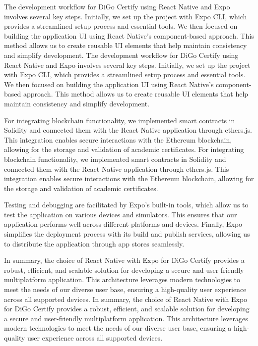 The development workflow for DiGo Certify using React Native and Expo involves several key steps. Initially, we set up the project with Expo CLI, which provides a streamlined setup process and essential tools. We then focused on building the application UI using React Native’s component-based approach. This method allows us to create reusable UI elements that help maintain consistency and simplify development.
The development workflow for DiGo Certify using React Native and Expo involves several key steps. Initially, we set up the project with Expo CLI, which provides a streamlined setup process and essential tools. We then focused on building the application UI using React Native’s component-based approach. This method allows us to create reusable UI elements that help maintain consistency and simplify development.

For integrating blockchain functionality, we implemented smart contracts in Solidity and connected them with the React Native application through ethers.js. This integration enables secure interactions with the Ethereum blockchain, allowing for the storage and validation of academic certificates.
For integrating blockchain functionality, we implemented smart contracts in Solidity and connected them with the React Native application through ethers.js. This integration enables secure interactions with the Ethereum blockchain, allowing for the storage and validation of academic certificates.

Testing and debugging are facilitated by Expo’s built-in tools, which allow us to test the application on various devices and simulators. This ensures that our application performs well across different platforms and devices. Finally, Expo simplifies the deployment process with its build and publish services, allowing us to distribute the application through app stores seamlessly.

In summary, the choice of React Native with Expo for DiGo Certify provides a robust, efficient, and scalable solution for developing a secure and user-friendly multiplatform application. This architecture leverages modern technologies to meet the needs of our diverse user base, ensuring a high-quality user experience across all supported devices.
In summary, the choice of React Native with Expo for DiGo Certify provides a robust, efficient, and scalable solution for developing a secure and user-friendly multiplatform application. This architecture leverages modern technologies to meet the needs of our diverse user base, ensuring a high-quality user experience across all supported devices.
